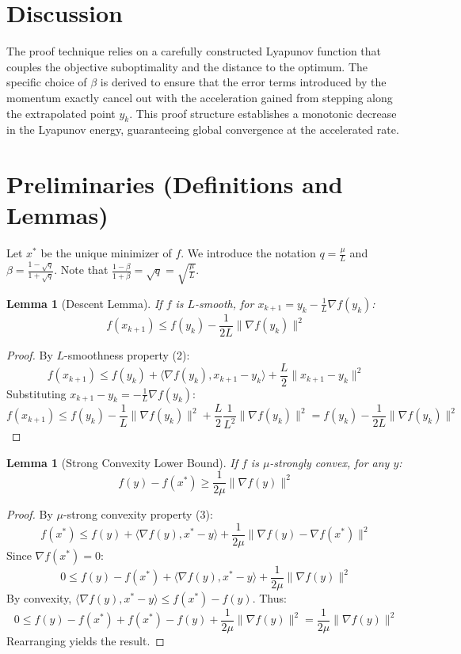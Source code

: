 \documentclass{article}
\newtheorem{lemma}[theorem]{Lemma}
\begin{document}
\section*{Discussion}
The proof technique relies on a carefully constructed Lyapunov function that couples the objective suboptimality and the distance to the optimum. The specific choice of $\beta$ is derived to ensure that the error terms introduced by the momentum exactly cancel out with the acceleration gained from stepping along the extrapolated point $y_k$. This proof structure establishes a monotonic decrease in the Lyapunov energy, guaranteeing global convergence at the accelerated rate.

\section*{Preliminaries (Definitions and Lemmas)}
Let $x^*$ be the unique minimizer of $f$. We introduce the notation $q = \frac{\mu}{L}$ and $\beta = \frac{1 - \sqrt{q}}{1 + \sqrt{q}}$. Note that $\frac{1-\beta}{1+\beta} = \sqrt{q} = \sqrt{\frac{\mu}{L}}$.

\begin{lemma}[Descent Lemma]
If $f$ is $L$-smooth, for $x_{k+1} = y_k - \frac{1}{L}\nabla f(y_k)$:
$$ f(x_{k+1}) \le f(y_k) - \frac{1}{2L}\|\nabla f(y_k)\|^2 $$
\end{lemma}
\begin{proof}
By $L$-smoothness property (2):
$$ f(x_{k+1}) \le f(y_k) + \langle \nabla f(y_k), x_{k+1} - y_k \rangle + \frac{L}{2}\|x_{k+1} - y_k\|^2 $$
Substituting $x_{k+1} - y_k = -\frac{1}{L}\nabla f(y_k)$:
$$ f(x_{k+1}) \le f(y_k) - \frac{1}{L}\|\nabla f(y_k)\|^2 + \frac{L}{2}\frac{1}{L^2}\|\nabla f(y_k)\|^2 = f(y_k) - \frac{1}{2L}\|\nabla f(y_k)\|^2 $$
\end{proof}

\begin{lemma}[Strong Convexity Lower Bound]
If $f$ is $\mu$-strongly convex, for any $y$:
$$ f(y) - f(x^*) \ge \frac{1}{2\mu}\|\nabla f(y)\|^2 $$
\end{lemma}
\begin{proof}
By $\mu$-strong convexity property (3):
$$ f(x^*) \le f(y) + \langle \nabla f(y), x^* - y \rangle + \frac{1}{2\mu}\|\nabla f(y) - \nabla f(x^*)\|^2 $$
Since $\nabla f(x^*) = 0$:
$$ 0 \le f(y) - f(x^*) + \langle \nabla f(y), x^* - y \rangle + \frac{1}{2\mu}\|\nabla f(y)\|^2 $$
By convexity, $\langle \nabla f(y), x^* - y \rangle \le f(x^*) - f(y)$. Thus:
$$ 0 \le f(y) - f(x^*) + f(x^*) - f(y) + \frac{1}{2\mu}\|\nabla f(y)\|^2 = \frac{1}{2\mu}\|\nabla f(y)\|^2 $$
Rearranging yields the result.
\end{proof}
\end{document}
